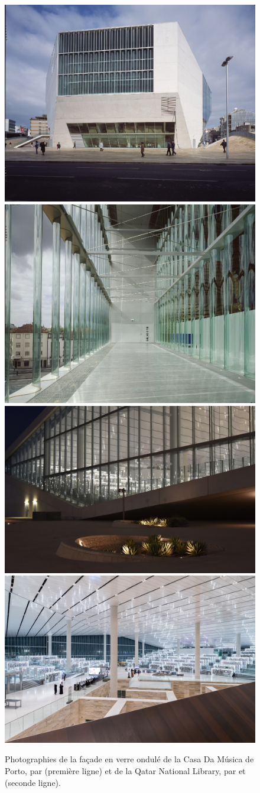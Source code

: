 \documentclass[11pt,titlepage]{article}
\begin{document}
\begin{figure}[H]
    \centering
    \includegraphics[height=0.392\textwidth]{img/ondul/casa_musica4 (1).jpg}\hfill
    \includegraphics[height=0.392\textwidth]{img/ondul/casa_musica1 (1).jpg}
    \\[\smallskipamount]
    \includegraphics[height=0.331\textwidth]{img/ondul/02_Qatar_National_Library__Photo_by_Hans_Werlemann_4180.jpg}\hfill
    \includegraphics[height=0.331\textwidth]{img/ondul/07_Qatar_National_Library__Photo_by_Iwan_Baan_5345.jpg}
    \caption{Photographies de la façade en verre ondulé de la Casa Da Música de Porto, par \Textcite{CasaDaMusica} (première ligne) et de la Qatar National Library, par \Textcite{quatNatLib} et \Textcite{quatNatLib2} (seconde ligne).}
    \label{fig:CasaDaMusica}
\end{figure}
\end{document}
